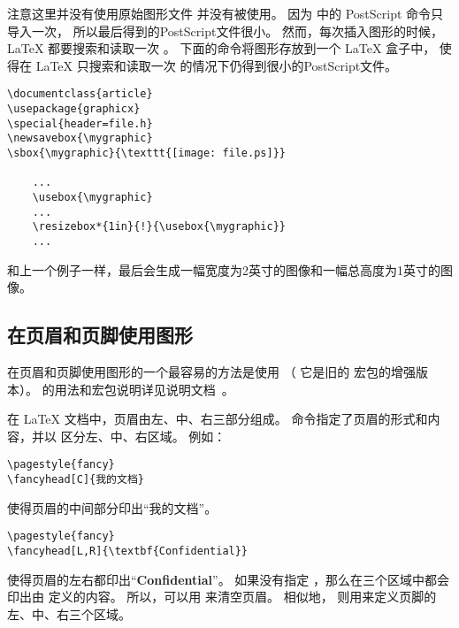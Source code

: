 注意这里并没有使用原始图形文件  并没有被使用。
因为  中的 PostScript 命令只导入一次，
所以最后得到的PostScript文件很小。
然而，每次插入图形的时候，\LaTeX{} 都要搜索和读取一次 。
下面的命令将图形存放到一个 \LaTeX{} 盒子中，
使得在 \LaTeX{} 只搜索和读取一次  的情况下仍得到很小的PostScript文件。
\begin{lstlisting}[xleftmargin=1cm]
\documentclass{article}
\usepackage{graphicx}
\special{header=file.h}
\newsavebox{\mygraphic}
\sbox{\mygraphic}{\texttt{[image: file.ps]}}

	...
	\usebox{\mygraphic}
	...
	\resizebox*{1in}{!}{\usebox{\mygraphic}}
	...

\end{lstlisting}
和上一个例子一样，最后会生成一幅宽度为2英寸的图像和一幅总高度为1英寸的图像。


\subsection{在页眉和页脚使用图形}\label{ssec:headgraph}

在页眉和页脚使用图形的一个最容易的方法是使用 （
它是旧的  宏包的增强版本）。
 的用法和宏包说明详见说明文档~\cite{fancyhdr-doc}。

在 \LaTeX{} 文档中，页眉由左、中、右三部分组成。
 命令指定了页眉的形式和内容，并以  区分左、中、右区域。
例如：
\begin{Verbatim}[xleftmargin=1cm]
\pagestyle{fancy}
\fancyhead[C]{我的文档}
\end{Verbatim}
使得页眉的中间部分印出“我的文档”。
\begin{Verbatim}[xleftmargin=1cm]
\pagestyle{fancy}
\fancyhead[L,R]{\textbf{Confidential}}
\end{Verbatim}
使得页眉的左右都印出“\textbf{Confidential}”。
如果没有指定 ，那么在三个区域中都会印出由  定义的内容。
所以，可以用  来清空页眉。 
相似地， 则用来定义页脚的左、中、右三个区域。


